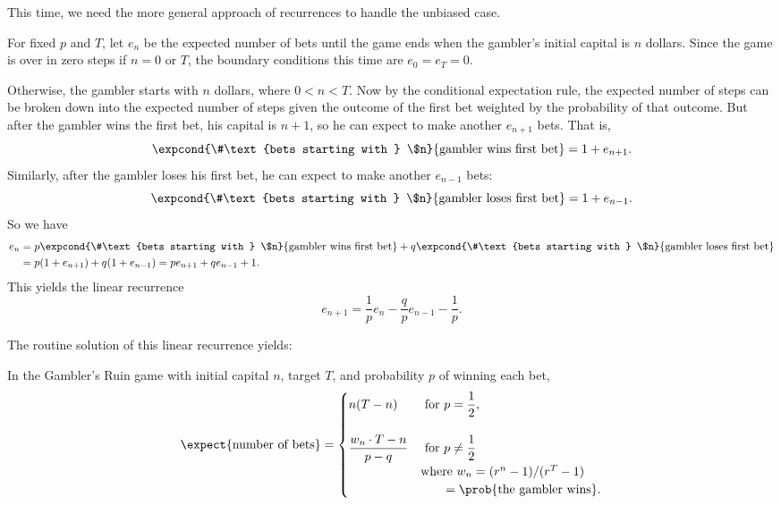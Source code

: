 This time, we need the more general approach of recurrences to handle the
unbiased case.  
\fi

For fixed $p$ and $T$, let $e_n$ be the expected number of bets until
the game ends when the gambler's initial capital is $n$ dollars.
Since the game is over in zero steps if $n=0$ or $T$, the boundary
conditions this time are $e_0=e_T=0$.

Otherwise, the gambler starts with $n$ dollars, where $0 < n < T$.
Now by the conditional expectation rule, the expected number of steps
can be broken down into the expected number of steps given the outcome
of the first bet weighted by the probability of that outcome.  But
after the gambler wins the first bet, his capital is $n+1$, so he can
expect to make another $e_{n+1}$ bets.
That is,
\[
\expcond{\#\text{bets starting with } \$n}{\text{gambler wins first bet}} = 1 + e_{n+1}.
\]
Similarly, after the gambler loses his first bet, he can expect to
make another $e_{n-1}$ bets:
\[
\expcond{\#\text{bets starting with } \$n}{\text{gambler loses first bet}} = 1 + e_{n-1}.
\]
So we have
\begin{align*}
e_n & = p\expcond{\#\text{bets starting with } \$n}{\text{gambler wins first bet}} +
      q\expcond{\#\text{bets starting with } \$n}{\text{gambler loses first bet}}\\
    & = p(1 + e_{n+1}) +  q(1 + e_{n-1}) =  pe_{n+1} + qe_{n-1} + 1.
\end{align*}
This yields the linear recurrence
\begin{equation}\label{expected-bets-recurrence}
e_{n+1} = \frac{1}{p} e_n - \frac{q}{p} e_{n-1} - \frac{1}{p}.
\end{equation}
\iffalse
For $p = q = 1/2$, this simplifies to
\begin{equation}\label{expected-fair-bets-recurrence}
e_{n+1} = 2e_n - e_{n-1} - 2.
\end{equation}

\fi

The routine solution of this linear recurrence yields:
\begin{theorem}\label{ExQthm}
In the Gambler's Ruin game with initial capital $n$, target
$T$, and probability $p$ of winning each bet,
\begin{equation}\label{expectedbets}
\expect{\text{number of bets}} =
 \begin{cases}
 n(T-n) & \text{ for } p = \dfrac{1}{2},\\
          \\ 
\dfrac{w_n  \cdot T - n}{p-q} %
       & \text{ for } p \neq \dfrac{1}{2}\\
       & \text{where } w_n = (r^n - 1)/(r^T - 1)\\
       & \qquad = \prob{\text{the gambler wins}}.
\end{cases}
\end{equation}
\end{theorem}

